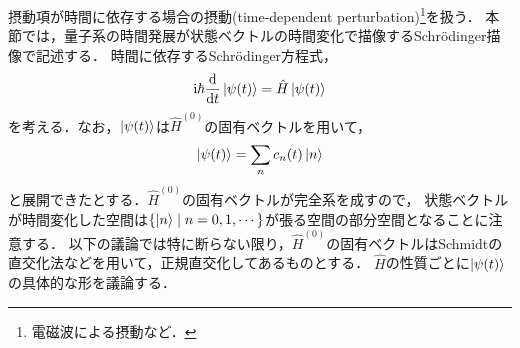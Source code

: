 \documentclass{report}
\begin{document}
  摂動項が時間に依存する場合の摂動(time-dependent perturbation)\footnote{電磁波による摂動など．}を扱う．
  本節では，量子系の時間発展が状態ベクトルの時間変化で描像するSchr\"odinger描像で記述する．
  時間に依存するSchrödinger方程式，
  \begin{align}
    \mathrm{i}\hbar\dv{t}\ket{\psi(t)} = \hat{H}\ket{\psi(t)}\label{time-dependent-schrodinger-eq}
  \end{align}
  を考える．なお，$\ket{\psi(t)}$は$\hat{H}^{(0)}$の固有ベクトルを用いて，
  \begin{align}
    \ket{\psi(t)} = \sum_{n}c_n(t)\ket{n}\label{psi-t-expantion}
  \end{align}
  と展開できたとする．$\hat{H}^{(0)}$の固有ベクトルが完全系を成すので，
  状態ベクトルが時間変化した空間は$\qty{\ket{n}\mid n = 0, 1, \cdots}$が張る空間の部分空間となることに注意する．
  以下の議論では特に断らない限り，$\hat{H}^{(0)}$の固有ベクトルはSchmidtの直交化法などを用いて，正規直交化してあるものとする．
  $\hat{H}$の性質ごとに$\ket{\psi(t)}$の具体的な形を議論する．
\end{document}
